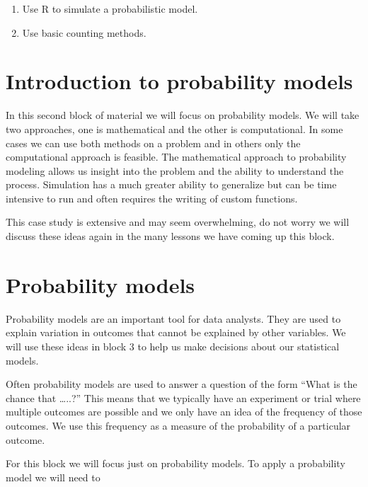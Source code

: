 \documentclass[
]{book}
\providecommand{\tightlist}{%
  \setlength{\itemsep}{0pt}\setlength{\parskip}{0pt}}
\begin{document}
\begin{enumerate}
\def\labelenumi{\arabic{enumi})}
\tightlist
\item
  Use R to simulate a probabilistic model.\\
\item
  Use basic counting methods.
\end{enumerate}

\hypertarget{introduction-to-probability-models}{%
\section{Introduction to probability models}\label{introduction-to-probability-models}}

In this second block of material we will focus on probability models. We will take two approaches, one is mathematical and the other is computational. In some cases we can use both methods on a problem and in others only the computational approach is feasible. The mathematical approach to probability modeling allows us insight into the problem and the ability to understand the process. Simulation has a much greater ability to generalize but can be time intensive to run and often requires the writing of custom functions.

This case study is extensive and may seem overwhelming, do not worry we will discuss these ideas again in the many lessons we have coming up this block.

\hypertarget{probability-models}{%
\section{Probability models}\label{probability-models}}

Probability models are an important tool for data analysts. They are used to explain variation in outcomes that cannot be explained by other variables. We will use these ideas in block 3 to help us make decisions about our statistical models.

Often probability models are used to answer a question of the form ``What is the chance that \ldots..?'' This means that we typically have an experiment or trial where multiple outcomes are possible and we only have an idea of the frequency of those outcomes. We use this frequency as a measure of the probability of a particular outcome.

For this block we will focus just on probability models. To apply a probability model we will need to
\end{document}
